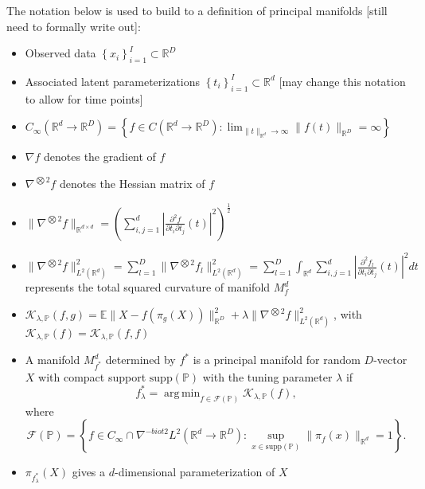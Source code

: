 \documentclass[11pt,reqno]{article}
\DeclareMathOperator*{\argmin}{arg\,min}
\begin{document}
The notation below is used to build to a definition of principal manifolds [still need to formally write out]:
\begin{itemize}
  \item Observed data $\left\{x_i\right\}_{i=1}^I \subset \mathbb{R}^D$
  \item Associated latent parameterizations $\left\{t_i\right\}_{i=1}^I \subset \mathbb{R}^d$ [may change this notation to allow for time points]
  \item $C_{\infty}\left(\mathbb{R}^d \to \mathbb{R}^D\right) = \left\{f \in C(\mathbb{R}^d \to \mathbb{R}^D): \lim_{\|t\|_{\mathbb{R}^d} \to \infty} \|f(t)\|_{\mathbb{R}^D} = \infty\right\}$ 
  \item $\nabla f$ denotes the gradient of $f$
  \item $\nabla^{\bigotimes 2}f$ denotes the Hessian matrix of $f$
  \item $\|\nabla^{\bigotimes 2}f\|_{\mathbb{R}^{d \times d}} = \left(\sum_{i, j = 1}^{d} |\frac{\partial^2f}{\partial t_i \partial t_j}(t)|^2\right)^{\frac{1}{2}}$
  \item $\|\nabla^{\bigotimes 2}f\|_{L^2(\mathbb{R}^{d})}^2 = \sum_{l = 1}^{D}\|\nabla^{\bigotimes 2}f_l\|_{L^2(\mathbb{R}^{d})}^2 = \sum_{l=1}^{D}\int_{\mathbb{R}^d}\sum_{i,j = 1}^{d}|\frac{\partial^2f_l}{\partial t_i \partial t_j}(t)|^2dt$ represents the total squared curvature of manifold $M_f^{d}$
  \item $\mathcal{K}_{\lambda, \mathbb{P}}(f, g) = \mathbb{E}\|X - f(\pi_{g}(X))\|_{\mathbb{R}^{D}}^2 + \lambda\|\nabla^{\bigotimes 2}f\|_{L^2(\mathbb{R}^{d})}^2$, with $\mathcal{K_{\lambda, \mathbb{P}}}(f) = \mathcal{K}_{\lambda, \mathbb{P}}(f, f)$
  \item A manifold $M_{f^*}^{d}$ determined by $f^*$ is a principal manifold for random $D$-vector $X$ with compact support $\text{supp}(\mathbb{P})$ with the tuning parameter $\lambda$ if \[%
    f_{\lambda}^{*} = \argmin_{f \in \mathcal{F}(\mathbb{P})}\mathcal{K}_{\lambda, \mathbb{P}}(f)
  ,\]%
    where \[%
      \mathcal{F}(\mathbb{P}) = \left\{f \in C_{\infty} \cap \nabla^{-biot 2}L^2(\mathbb{R}^{d} \to \mathbb{R}^{D}): \sup_{x \in \text{supp}(\mathbb{P})}\|\pi_f(x)\|_{\mathbb{R}^{d}} = 1\right\}
    .\]%
  \item $\pi_{f_\lambda^{*}}(X)$ gives a $d$-dimensional parameterization of $X$
\end{itemize}
\end{document}
